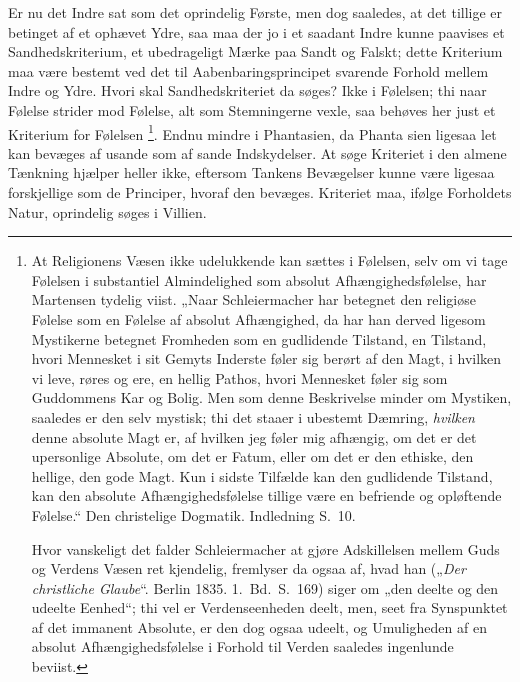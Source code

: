 \documentclass[12pt]{book}
\begin{document}
Er nu det Indre sat som det oprindelig Første, men dog saaledes, at
det tillige er betinget af et ophævet Ydre, saa maa der jo i et
saadant Indre kunne paavises et Sandhedskriterium, et ubedrageligt
Mærke paa Sandt og Falskt; dette Kriterium maa være bestemt ved det
til Aabenbaringsprincipet svarende Forhold mellem Indre og Ydre.
Hvori skal Sandhedskriteriet da søges? Ikke i Følelsen; thi naar
Følelse strider mod Følelse, alt som Stemningerne vexle, saa behøves
her just et Kriterium for Følelsen%
\footnote{At Religionens Væsen ikke udelukkende kan sættes i
Følelsen, selv om vi tage Følelsen i substantiel Almindelighed som
absolut Afhængighedsfølelse, har Martensen tydelig viist. „Naar
Schleiermacher har betegnet den religiøse Følelse som en Følelse af
absolut Afhængighed, da har han derved ligesom Mystikerne betegnet
Fromheden som en gudlidende Tilstand, en Tilstand, hvori Mennesket i
sit Gemyts Inderste føler sig berørt af den Magt, i hvilken vi leve,
røres og ere, en hellig Pathos, hvori Mennesket føler sig som
Guddommens Kar og Bolig. Men som denne Beskrivelse minder om
Mystiken, saaledes er den selv mystisk; thi det staaer i ubestemt
Dæmring, \emph{hvilken} denne absolute Magt er, af hvilken jeg føler
mig afhængig, om det er det upersonlige Absolute, om det er Fatum,
eller om det er den ethiske, den hellige, den gode Magt. Kun i
sidste Tilfælde kan den gudlidende Tilstand, kan den absolute
Afhængighedsfølelse tillige være en befriende og opløftende
Følelse.“ Den christelige Dogmatik. Indledning S.\ 10.\par
Hvor vanskeligt det falder Schleiermacher at gjøre Adskillelsen
mellem Guds og Verdens Væsen ret kjendelig, fremlyser da ogsaa af,
hvad han („\textit{Der christliche Glaube}“. Berlin 1835. 1.\ Bd.\
S.\ 169) siger om „den deelte og den udeelte Eenhed“; thi vel er
Verdenseenheden deelt, men, seet fra Synspunktet af det immanent
Absolute, er den dog ogsaa udeelt, og Umuligheden af en absolut
Afhængighedsfølelse i Forhold til Verden saaledes ingenlunde
beviist.}.
Endnu mindre i Phantasien, da Phanta\-
sien ligesaa let kan bevæges af usande som af sande Indskydelser. At
søge Kriteriet i den almene Tænkning hjælper heller ikke, eftersom
Tankens Bevægelser kunne være ligesaa forskjellige som de Principer,
hvoraf den bevæges. Kriteriet maa, ifølge Forholdets Natur,
oprindelig søges i Villien.
\end{document}
